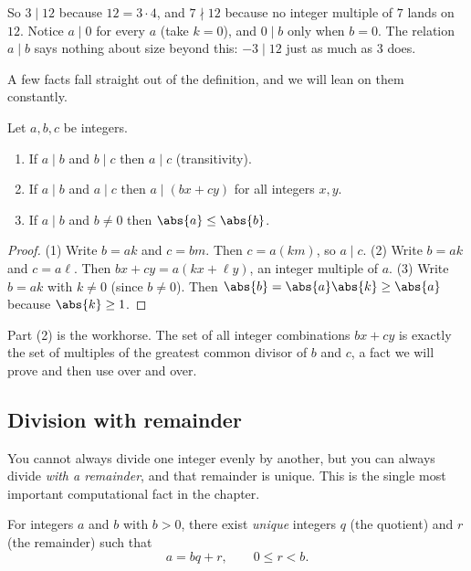 So $3 \mid 12$ because $12 = 3 \cdot 4$, and $7 \nmid 12$ because no integer multiple of $7$ lands
on $12$. Notice $a \mid 0$ for every $a$ (take $k = 0$), and $0 \mid b$ only when $b = 0$. The
relation $a \mid b$ says nothing about size beyond this: $-3 \mid 12$ just as much as $3$ does.

A few facts fall straight out of the definition, and we will lean on them constantly.

\begin{proposition}
\label{ch04:prop-div-rules}
Let $a, b, c$ be integers.
\begin{enumerate}
\item If $a \mid b$ and $b \mid c$ then $a \mid c$ (transitivity).
\item If $a \mid b$ and $a \mid c$ then $a \mid (bx + cy)$ for all integers $x, y$.
\item If $a \mid b$ and $b \neq 0$ then $\abs{a} \le \abs{b}$.
\end{enumerate}
\end{proposition}

\begin{proof}
(1) Write $b = ak$ and $c = bm$. Then $c = a(km)$, so $a \mid c$.
(2) Write $b = ak$ and $c = a\ell$. Then $bx + cy = a(kx + \ell y)$, an integer multiple of $a$.
(3) Write $b = ak$ with $k \neq 0$ (since $b \neq 0$). Then $\abs{b} = \abs{a}\abs{k} \ge \abs{a}$
because $\abs{k} \ge 1$.
\end{proof}

Part (2) is the workhorse. The set of all integer combinations $bx + cy$ is exactly the set of
multiples of the greatest common divisor of $b$ and $c$, a fact we will prove and then use over and
over.

\subsection*{Division with remainder}

You cannot always divide one integer evenly by another, but you can always divide \emph{with a
remainder}, and that remainder is unique. This is the single most important computational fact in
the chapter.

\begin{theorem}
\label{ch04:thm-division}
For integers $a$ and $b$ with $b > 0$, there exist \emph{unique} integers $q$ (the quotient) and
$r$ (the remainder) such that
\[
  a = bq + r, \qquad 0 \le r < b.
\]
\end{theorem}

